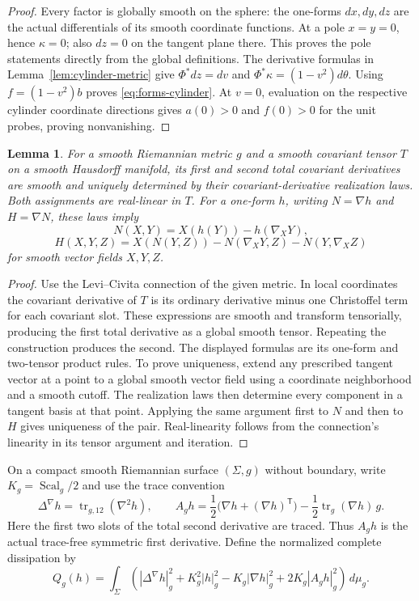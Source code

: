 \documentclass[11pt]{article}
\newtheorem{lemma}[theorem]{Lemma}
\begin{document}
\begin{proof}
Every factor is globally smooth on the sphere: the one-forms $dx,dy,dz$
are the actual differentials of its smooth coordinate functions. At a pole
$x=y=0$, hence $\kappa=0$; also $dz=0$ on the tangent plane there. This proves
the pole statements directly from the global definitions.
The derivative formulas in Lemma~\ref{lem:cylinder-metric} give
$\Phi^*dz=dv$ and $\Phi^*\kappa=(1-v^2)d\theta$.
Using $f=(1-v^2)b$ proves \eqref{eq:forms-cylinder}.
At $v=0$, evaluation on the respective cylinder coordinate directions
gives $a(0)>0$ and $f(0)>0$ for the unit probes, proving nonvanishing.
\end{proof}

\begin{lemma}\label{lem:canonical-derivatives}
For a smooth Riemannian metric $g$ and a smooth covariant tensor $T$ on a
smooth Hausdorff manifold, its first and second total covariant derivatives
are smooth and uniquely determined by their covariant-derivative realization
laws. Both assignments are real-linear in $T$.
For a one-form $h$, writing $N=\nabla h$ and $H=\nabla N$, these laws imply
\[
 N(X,Y)=X(h(Y))-h(\nabla_XY),
\]
\[
 H(X,Y,Z)=X(N(Y,Z))-N(\nabla_XY,Z)-N(Y,\nabla_XZ)
\]
for smooth vector fields $X,Y,Z$.
\end{lemma}

\begin{proof}
Use the Levi--Civita connection of the given metric. In local coordinates
the covariant derivative of $T$ is its ordinary derivative minus one
Christoffel term for each covariant slot. These expressions are smooth
and transform tensorially, producing the first total derivative as a
global smooth tensor. Repeating the construction produces the second.
The displayed formulas are its one-form and two-tensor product rules.
To prove uniqueness, extend any prescribed tangent vector at a point to
a global smooth vector field using a coordinate neighborhood and a smooth
cutoff. The realization laws then determine every component in a tangent
basis at that point. Applying the same argument first to $N$ and then to
$H$ gives uniqueness of the pair. Real-linearity follows from the
connection's linearity in its tensor argument and iteration.
\end{proof}

On a compact smooth Riemannian surface $(\Sigma,g)$ without boundary, write
$K_g=\operatorname{Scal}_g/2$ and use the trace convention
\[
 \Delta^\nabla h=\operatorname{tr}_{g,12}(\nabla^2h),\qquad
 A_g h=\frac12\bigl(\nabla h+(\nabla h)^{\mathsf T}\bigr)
       -\frac12\operatorname{tr}_g(\nabla h)\,g.
\]
Here the first two slots of the total second derivative are traced.
Thus $A_g h$ is the actual trace-free symmetric first derivative.
Define the normalized complete dissipation by
\begin{equation}\label{eq:complete-dissipation}
 Q_g(h)=\int_\Sigma
 \left(
 |\Delta^\nabla h|_g^2+K_g^2|h|_g^2
 -K_g|\nabla h|_g^2+2K_g|A_g h|_g^2
 \right)\,d\mu_g .
\end{equation}
\end{document}
